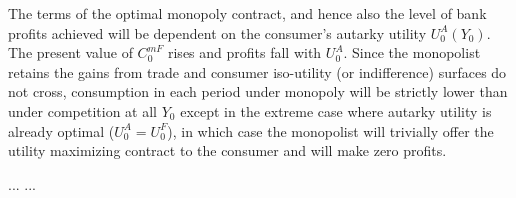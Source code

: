 \documentclass[11pt,english]{article}
\theoremstyle{plain}
\theoremstyle{plain}
\theoremstyle{plain}
\begin{document}
The terms of the optimal monopoly contract, and hence also the level
of bank profits achieved will be dependent on the consumer's autarky
utility $U_{0}^{A}(Y_{0})$. The present value of $C_{0}^{mF}$ rises
and profits fall with $U_{0}^{A}$. Since the monopolist retains the
gains from trade and consumer iso-utility (or indifference) surfaces
do not cross, consumption in each period under monopoly will be strictly
lower than under competition at all $Y_{0}$ except in the extreme
case where autarky utility is already optimal ($U_{0}^{A}=U_{0}^{F}$),
in which case the monopolist will trivially offer the utility maximizing
contract to the consumer and will make zero profits.
 
 
\begin{thebibliography}{99}
 ...
 ...
\end{thebibliography}
\end{document}
